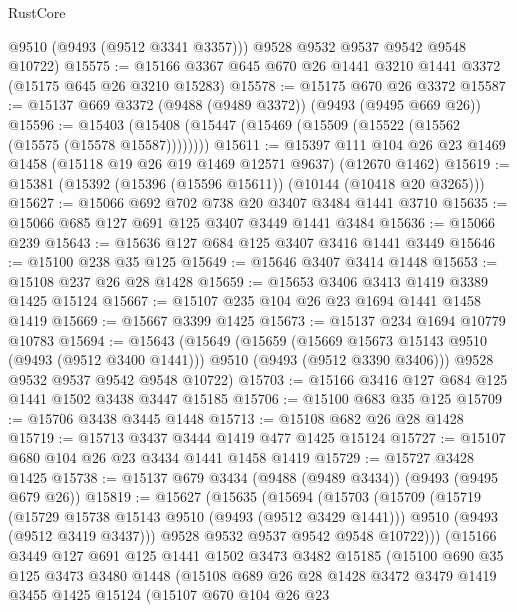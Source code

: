 \begin{lexlean}{RustCore}
\begin{coremodule}
        @9510
        (@9493 (@9512 @3341 @3357)))
      @9528
      @9532
      @9537
      @9542
      @9548
      @10722)
@15575 := @15166 @3367 @645 @670 @26 @1441 @3210 @1441 @3372 (@15175 @645 @26 @3210 @15283)
@15578 := @15175 @670 @26 @3372
@15587 := @15137 @669 @3372 (@9488 (@9489 @3372)) (@9493 (@9495 @669 @26))
@15596 := @15403 (@15408 (@15447 (@15469 (@15509 (@15522 (@15562 (@15575 (@15578 @15587))))))))
@15611 := @15397
    @111
    @104
    @26
    @23
    @1469
    @1458
    (@15118 @19 @26 @19 @1469 @12571 @9637)
    (@12670 @1462)
@15619 := @15381 (@15392 (@15396 (@15596 @15611)) (@10144 (@10418 @20 @3265)))
@15627 := @15066 @692 @702 @738 @20 @3407 @3484 @1441 @3710
@15635 := @15066 @685 @127 @691 @125 @3407 @3449 @1441 @3484
@15636 := @15066 @239
@15643 := @15636 @127 @684 @125 @3407 @3416 @1441 @3449
@15646 := @15100 @238 @35 @125
@15649 := @15646 @3407 @3414 @1448
@15653 := @15108 @237 @26 @28 @1428
@15659 := @15653 @3406 @3413 @1419 @3389 @1425 @15124
@15667 := @15107 @235 @104 @26 @23 @1694 @1441 @1458 @1419
@15669 := @15667 @3399 @1425
@15673 := @15137 @234 @1694 @10779 @10783
@15694 := @15643
    (@15649
      (@15659
        (@15669 @15673 @15143 @9510 (@9493 (@9512 @3400 @1441)))
        @9510
        (@9493 (@9512 @3390 @3406)))
      @9528
      @9532
      @9537
      @9542
      @9548
      @10722)
@15703 := @15166 @3416 @127 @684 @125 @1441 @1502 @3438 @3447 @15185
@15706 := @15100 @683 @35 @125
@15709 := @15706 @3438 @3445 @1448
@15713 := @15108 @682 @26 @28 @1428
@15719 := @15713 @3437 @3444 @1419 @477 @1425 @15124
@15727 := @15107 @680 @104 @26 @23 @3434 @1441 @1458 @1419
@15729 := @15727 @3428 @1425
@15738 := @15137 @679 @3434 (@9488 (@9489 @3434)) (@9493 (@9495 @679 @26))
@15819 := @15627
    (@15635
      (@15694
        (@15703
          (@15709
            (@15719
              (@15729 @15738 @15143 @9510 (@9493 (@9512 @3429 @1441)))
              @9510
              (@9493 (@9512 @3419 @3437)))
            @9528
            @9532
            @9537
            @9542
            @9548
            @10722)))
      (@15166
        @3449
        @127
        @691
        @125
        @1441
        @1502
        @3473
        @3482
        @15185
        (@15100
          @690
          @35
          @125
          @3473
          @3480
          @1448
          (@15108
            @689
            @26
            @28
            @1428
            @3472
            @3479
            @1419
            @3455
            @1425
            @15124
            (@15107
              @670
              @104
              @26
              @23

\end{coremodule}
\end{lexlean}
